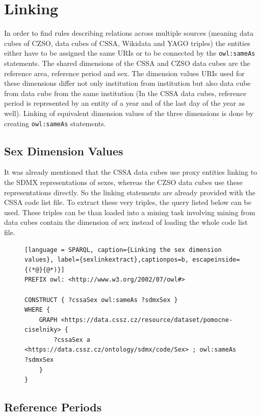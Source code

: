 \section{Linking\label{linking}}

In order to find rules describing relations across multiple sources (meaning data cubes of CZSO, data cubes of CSSA, Wikidata and YAGO triples) the entities either have to be assigned the same URIs or to be connected by the \verb|owl:sameAs| statements. The shared dimensions of the CSSA and CZSO data cubes are the reference area, reference period and sex. The dimension values URIs used for these dimensions differ not only institution from institution but also data cube from data cube from the same institution (In the CSSA data cubes, reference period is represented by an entity of a year and of the last day of the year as well). Linking of equivalent dimension values of the three dimensions is done by creating \verb|owl:sameAs| statements.

\subsection{Sex Dimension Values}

It was already mentioned that the CSSA data cubes use proxy entities linking to the SDMX representations of sexes, whereas the CZSO data cubes use these representations directly. So the linking statements are already provided with the CSSA code list file. To extract these very triples, the query listed below can be used. These triples can be than loaded into a mining task involving mining from data cubes contain the dimension of sex instead of loading the whole code list file.

\begin{figure}[h]
\begin{lstlisting}[language = SPARQL, caption={Linking the sex dimension values}, label={sexlinkextract},captionpos=b, escapeinside={(*@}{@*)}]
PREFIX owl: <http://www.w3.org/2002/07/owl#>

CONSTRUCT { ?cssaSex owl:sameAs ?sdmxSex }
WHERE {
    GRAPH <https://data.cssz.cz/resource/dataset/pomocne-ciselniky> {
        ?cssaSex a <https://data.cssz.cz/ontology/sdmx/code/Sex> ; owl:sameAs ?sdmxSex
    }
}
\end{lstlisting}
\end{figure}

\subsection{Reference Periods}

